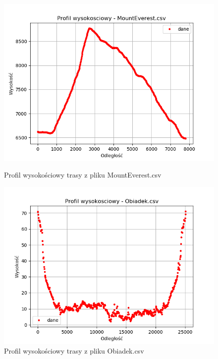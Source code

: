\documentclass{article} %
\begin{document}
\begin{figure}[h!]
\begin{minipage}[b]{0.4\textwidth}
        \includegraphics[width=\textwidth]{profile_wysokosciowe/me_pw.png}
        \caption{Profil wysokościowy trasy z pliku MountEverest.csv}
    \end{minipage}
    \hfill
    \begin{minipage}[b]{0.4\textwidth}
        \includegraphics[width=\textwidth]{profile_wysokosciowe/ob_pw.png}
        \caption{Profil wysokościowy trasy z pliku Obiadek.csv}
    \end{minipage}
\end{figure}
\end{document}
